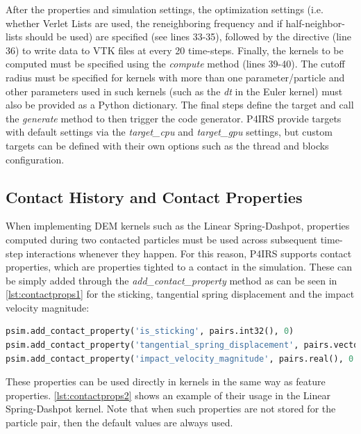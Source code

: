 \documentclass[preprint,12pt]{elsarticle}
\begin{document}
After the properties and simulation settings, the optimization settings (i.e. whether Verlet Lists are used, the reneighboring frequency and if half-neighbor-lists should be used) are specified (see lines 33-35), followed by the directive (line 36) to write data to VTK files at every 20 time-steps.
Finally, the kernels to be computed must be specified using the \emph{compute} method (lines 39-40).
The cutoff radius must be specified for kernels with more than one parameter/particle and other parameters used in such kernels (such as the \emph{dt} in the Euler kernel) must also be provided as a Python dictionary.
The final steps define the target and call the \emph{generate} method to then trigger the code generator.
P4IRS provide targets with default settings via the \emph{target\_cpu} and \emph{target\_gpu} settings, but custom targets can be defined with their own options such as the thread and blocks configuration.


\subsection{Contact History and Contact Properties}
\label{sec:contact_history}

When implementing DEM kernels such as the Linear Spring-Dashpot, properties computed during two contacted particles must be used across subsequent time-step interactions whenever they happen.
For this reason, P4IRS supports contact properties, which are properties tighted to a contact in the simulation.
These can be simply added through the \emph{add\_contact\_property} method as can be seen in \autoref{lst:contactprops1} for the sticking, tangential spring displacement and the impact velocity magnitude:

\begin{lstlisting}[language=Python,
		   label={lst:contactprops1},
		   caption={Setup example for contact properties.}]
psim.add_contact_property('is_sticking', pairs.int32(), 0)
psim.add_contact_property('tangential_spring_displacement', pairs.vector(), [0.0, 0.0, 0.0])
psim.add_contact_property('impact_velocity_magnitude', pairs.real(), 0.0)
\end{lstlisting}

These properties can be used directly in kernels in the same way as feature properties.
\autoref{lst:contactprops2} shows an example of their usage in the Linear Spring-Dashpot kernel.
Note that when such properties are not stored for the particle pair, then the default values are always used.
\end{document}

